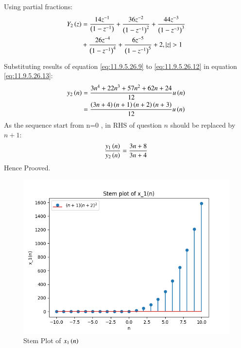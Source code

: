 \documentclass[journal,12pt,twocolumn]{IEEEtran}
\theoremstyle{remark}
\begin{document}
\begin{enumerate}[label=\arabic*.]
Using partial fractions:
\begin{align}
    Y_2\left(z\right) &= \frac{14z^{-1}}{\left(1-z^{-1}\right)} + \frac{36z^{-2}}{\left(1-z^{-1}\right)^2} + \frac{44z^{-3}}{\left(1-z^{-3}\right)^3} \label{eq:11.9.5.26.13}\\
    &+ \frac{26z^{-4}}{\left(1-z^{-1}\right)^4}+\frac{6z^{-5}}{\left(1-z^{-1}\right)^5}+2 , \left\vert z\right\vert>1\notag 
\end{align}

Substituting results of equation \eqref{eq:11.9.5.26.9} to \eqref{eq:11.9.5.26.12} in equation \eqref{eq:11.9.5.26.13}:
\begin{align}
    y_2\left(n\right) &=  \frac{3n^4 + 22n^3 + 57n^2 + 62n + 24}{12}u\left(n\right)\\
                &= \frac{\left(3n+4\right)\left(n+1\right)\left(n+2\right)\left(n+3\right)}{12}u\left(n\right)
\end{align}
As the sequence start from n=0 , in RHS of question $n$ should be replaced by $n+1$:
\begin{align}
    \frac{y_1\left(n\right)}{y_2\left(n\right)} = \frac{3n+8}{3n+4}
\end{align}
Hence Prooved.
\end{enumerate}


\begin{figure}[htbp]
    \centering
    \includegraphics[width=1\columnwidth]{figs/x1_plot.png}
    \caption{Stem Plot of $x_1\left(n\right)$}
    \label{fig:x1}
\end{figure}
\end{document}
